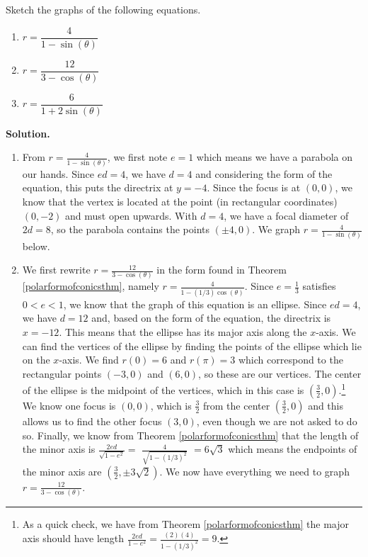 \begin{ex}  \label{polarconicgraphex}  Sketch the graphs of the following equations.


\begin{multicols}{3}
\begin{enumerate}

\item  \label{polarparabola} $r  = \dfrac{4}{1-\sin(\theta)}$

\item  $r = \dfrac{12}{3 - \cos(\theta)}$  

\item  $r = \dfrac{6}{1 + 2\sin(\theta)}$


\end{enumerate}
\end{multicols}



{\bf Solution.}  \begin{enumerate}  \item From $r  = \frac{4}{1-\sin(\theta)}$, we first note $e =1$ which means we have a parabola on our hands.  Since $ed = 4$, we have $d=4$ and considering the form of the equation, this puts the directrix at $y = -4$.  Since the focus is at $(0,0)$, we know that the vertex is located at the point (in rectangular coordinates) $(0,-2)$ and must open upwards.  With $d=4$, we have a focal diameter of $2d = 8$, so the parabola contains the points $(\pm 4, 0)$.  We graph  $r  = \frac{4}{1-\sin(\theta)}$ below.


\item  We first rewrite $r = \frac{12}{3 - \cos(\theta)}$ in the form found in Theorem \ref{polarformofconicsthm}, namely $r = \frac{4}{1 - (1/3) \cos(\theta)}$.  Since $e = \frac{1}{3}$ satisfies $0 < e < 1$, we know that the graph of this equation is an ellipse.  Since $ed= 4$, we have $d = 12$ and, based on the form of the equation, the directrix is $x = -12$.  This means that the ellipse has its major axis along the $x$-axis.   We can find the vertices of the ellipse by finding the points of the ellipse which lie on the $x$-axis.  We find $r(0) = 6$ and $r(\pi) = 3$ which correspond to the rectangular points $(-3,0)$ and $(6,0)$, so these are our vertices.  The center of the ellipse is the midpoint of the vertices,  which in this case is $\left(\frac{3}{2}, 0\right)$.\footnote{As a quick check, we have from Theorem \ref{polarformofconicsthm} the major axis should have length $\frac{2ed}{1-e^2} = \frac{(2)(4)}{1-(1/3)^2} = 9$.}  We know one focus is $(0,0)$, which is $\frac{3}{2}$ from the center $\left(\frac{3}{2}, 0\right)$ and this allows us to find the other focus $(3, 0)$, even though we are not asked to do so.  Finally, we know from Theorem \ref{polarformofconicsthm} that the length of the minor axis is $\frac{2ed}{\sqrt{1-e^2}} =$ {\scriptsize $\frac{4}{\sqrt{1-(1/3)^2}}$} $= 6\sqrt{3}$ which means the endpoints of the minor axis are $\left(\frac{3}{2}, \pm 3\sqrt{2}\right)$. We now have everything we need to graph $r = \frac{12}{3 - \cos(\theta)}$.


\end{enumerate}
\end{ex}

